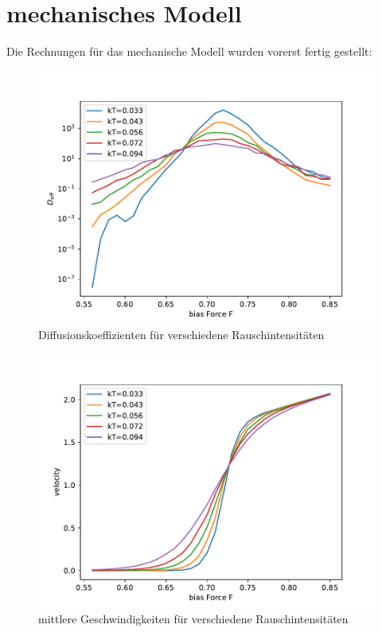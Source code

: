 \documentclass[12pt,a4paper]{article}
\begin{document}
\section{mechanisches Modell}
Die Rechnungen für das mechanische Modell wurden vorerst fertig gestellt: 
\begin{figure}[H]
	\centering
	\includegraphics[scale=0.9]{mechdsht.pdf} 
	\caption{Diffusionskoeffizienten für verschiedene Rauschintensitäten}
	\label{mdsh}
\end{figure}
\begin{figure}[H]
	\centering
	\includegraphics[scale=0.9]{mechgsht.pdf} 
	\caption{mittlere Geschwindigkeiten für verschiedene Rauschintensitäten}
	\label{mgsh}
\end{figure}
\end{document}
